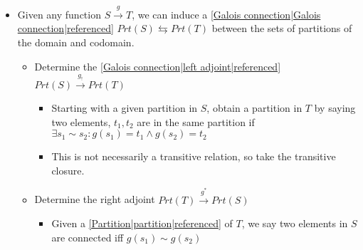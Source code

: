 \begin{itemize}
    \item Given any function $S \xrightarrow{g} T$, we can induce a \ref{Galois connection|Galois connection|referenced} $Prt(S) \leftrightarrows Prt(T)$ between the sets of partitions of the domain and codomain.
          \begin{itemize}
            \item Determine the \ref{Galois connection|left adjoint|referenced} $Prt(S) \xrightarrow{g_!} Prt(T)$
                  \begin{itemize}
                    \item Starting with a given partition in $S$, obtain a partition in $T$ by saying two elements, $t_1,t_2$ are in the same partition if $\exists s_1 \sim s_2: g(s_1)=t_1 \land g(s_2)=t_2$
                    \item This is not necessarily a transitive relation, so take the transitive closure.
                  \end{itemize}
            \item Determine the right adjoint $Prt(T) \xrightarrow{g^*} Prt(S)$
                  \begin{itemize}
                    \item Given a \ref{Partition|partition|referenced} of $T$, we say two elements in $S$ are connected iff $g(s_1) \sim g(s_2)$
                  \end{itemize}
          \end{itemize}
  \end{itemize}